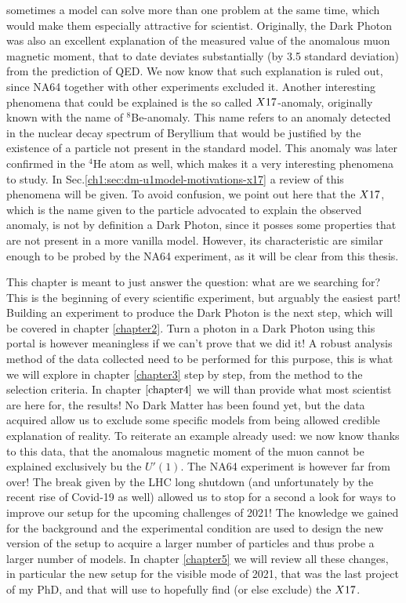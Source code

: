 sometimes a model can solve more than one problem at the same time, which would make them especially attractive for scientist. Originally, the Dark Photon was also an excellent explanation of the measured value of the anomalous muon magnetic moment, that to date deviates substantially (by 3.5 standard deviation) from the prediction of QED. We now know that such explanation is ruled out, since NA64 together with other experiments excluded it. Another interesting phenomena that could be explained is the so called $X17$-anomaly, originally known with the name of $^8$Be-anomaly. This name refers to an anomaly detected in the nuclear decay spectrum of Beryllium that would be justified by the existence of a particle not present in the standard model. This anomaly was later confirmed in the $^4$He atom as well, which makes it a very interesting phenomena to study. In Sec.\ref{ch1:sec:dm-u1model-motivations-x17} a review of this phenomena will be given. To avoid confusion, we point out here that the $X17$, which is the name given to the particle advocated to explain the observed anomaly, is not by definition a Dark Photon, since it posses some properties that are not present in a more vanilla model. However, its characteristic are similar enough to be probed by the NA64 experiment, as it will be clear from this thesis.

This chapter is meant to just answer the question: what are we searching for? This is the beginning of every scientific experiment, but arguably the easiest part! Building an experiment to produce the Dark Photon is the next step, which will be covered in chapter \ref{chapter2}. Turn a photon in a Dark Photon using this portal is however meaningless if we can't prove that we did it! A robust analysis method of the data collected need to be performed for this purpose, this is what we will explore in chapter \ref{chapter3} step by step, from the method to the selection criteria. In chapter $\ref{chapter4}$ we will than provide what most scientist are here for, the results! No Dark Matter has been found yet, but the data acquired allow us to exclude some specific models from being allowed credible explanation of reality. To reiterate an example already used: we now know thanks to this data, that the anomalous magnetic moment of the muon cannot be explained exclusively bu the $U'(1)$. The NA64 experiment is however far from over! The break given by the LHC long shutdown (and unfortunately by the recent rise of Covid-19 as well) allowed us to stop for a second a look for ways to improve our setup for the upcoming challenges of 2021! The knowledge we gained for the background and the experimental condition are used to design the new version of the setup to acquire a larger number of particles and thus probe a larger number of models. In chapter \ref{chapter5} we will review all these changes, in particular the new setup for the visible mode of 2021, that was the last project of my PhD, and that will use to hopefully find (or else exclude) the $X17$.

